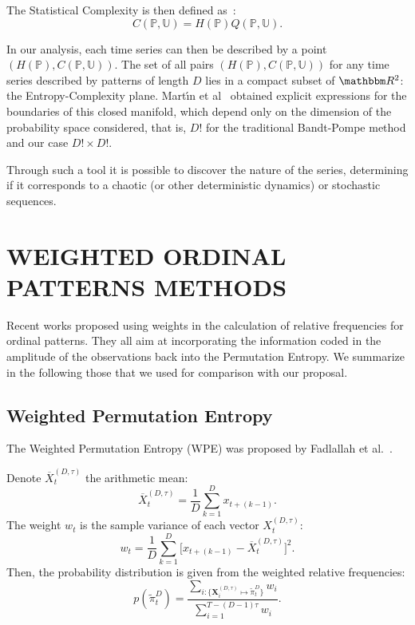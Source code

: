 \documentclass[journal]{IEEEtran}
\begin{document}
	The Statistical Complexity is then defined as~\cite{Lamberti2004Entropic}:
	\begin{equation}
	C(\mathbb{P}, \mathbb{U}) = H(\mathbb{P}) Q(\mathbb{P}, \mathbb{U}).
	\end{equation}
	
	In our analysis, each time series can then be described by a point $(H(\mathbb{P}), C(\mathbb{P}, \mathbb{U}))$.
	The set of all pairs $(H(\mathbb{P}), C(\mathbb{P}, \mathbb{U}))$ for any time series described by patterns of length $D$ lies in a compact subset of $\mathbbm R^2$: the Entropy-Complexity plane.
	Mart\'{\i}n et al~\cite{martin2006generalized} obtained explicit expressions for the boundaries of this closed manifold, which depend only on the dimension of the probability space considered, that is, $D!$ for the traditional Bandt-Pompe method and our case $D! \times D!$.
	
	Through such a tool it is possible to discover the nature of the series, determining if it corresponds to a chaotic (or other deterministic dynamics) or stochastic sequences.
	
	\section{WEIGHTED ORDINAL PATTERNS METHODS}\label{Methods}
	
	Recent works proposed using weights in the calculation of relative frequencies for ordinal patterns.
	They all aim at incorporating the information coded in the amplitude of the observations back into the Permutation Entropy.
	We summarize in the following those that we used for comparison with our proposal.
	
	\subsection{Weighted Permutation Entropy}\label{WPE}
	
	The Weighted Permutation Entropy (WPE) was proposed by Fadlallah et al.~\cite{Fadlallah2013Weightedpermutation}. 
	
	Denote $\overline{X}_t^{(D, \tau)}$ the arithmetic mean:
	\begin{equation}
	\overline{X}_t^{(D, \tau)} = \frac{1}{D} \sum_{k = 1}^{D} x_{t + (k - 1)}.
	\end{equation}
	The weight $w_{t}$ is the sample variance of each vector $X_t^{(D, \tau)}$:
	\begin{equation}
	w_{t} = \frac{1}{D} \sum_{k = 1}^{D}\big[x_{t + (k - 1)} - \overline{X}_t^{(D, \tau)}\big]^2 .
	\end{equation}
	Then, the probability distribution is given from the weighted relative frequencies:
	\begin{equation}
	p(\widetilde \pi_t^D) = \frac{\sum_{i : \{\mathbf{X}^{(D,\tau)}_i \mapsto \widetilde\pi^D_t\}} w_{i}}{\sum_{i = 1}^{T-(D-1)\tau} w_{i}}.
	\end{equation}
	
\end{document}
